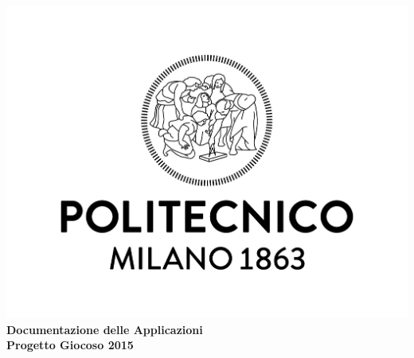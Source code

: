 \begin{titlepage}
\begin{center}
\vspace*{2cm}
\includegraphics[width=\textwidth]{polimi_logo.jpg}
\Huge
\textbf{%
Documentazione delle Applicazioni \\
Progetto Giocoso 2015}
\end{center}
\end{titlepage}
